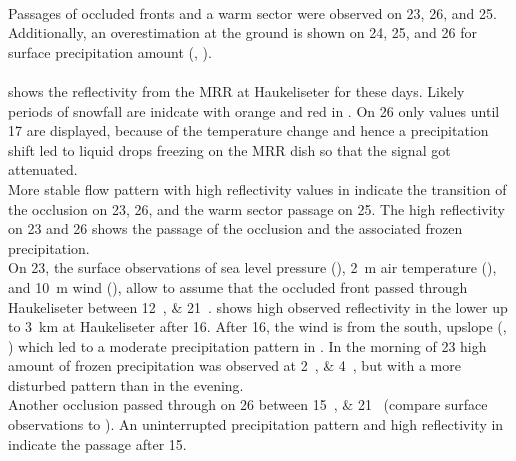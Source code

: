 \\
Passages of occluded fronts and a warm sector were observed on \num{23}, \num{26}, and \SI{25}{\dec}. Additionally, an overestimation at the ground is shown on  \num{24}, \num{25}, and \SI{26}{\dec} for surface precipitation amount (, ). 
\\
\\
 shows the reflectivity from the MRR at Haukeliseter for these days. Likely periods of snowfall are inidcate with orange and red in .%
On \SI{26}{\dec} only values until \SI{17}{\UTC} are displayed, because of the temperature change and hence a precipitation shift led to liquid drops freezing on the MRR dish so that the signal got attenuated. 
\\
More stable flow pattern with high reflectivity values in  indicate the transition of the occlusion on \num{23}, \num{26}, and the warm sector passage on \SI{25}{\dec}.
The high reflectivity on \num{23} and \SI{26}{\dec} shows the passage of the occlusion and the associated frozen precipitation.
\\
On \SI{23}{\dec}, the surface observations of sea level pressure (), \SI{2}{\metre} air temperature (), and \SI{10}{\metre} wind (), allow to assume that the occluded front passed through Haukeliseter between \SIlist{12;21}{\UTC}.
 shows high observed reflectivity in the lower up to \SI{3}{\km} at Haukeliseter after \SI{16}{\UTC}.
After \SI{16}{\UTC}, the wind is from the south, upslope (, ) which led to a moderate precipitation pattern in . 
In the morning of \SI{23}{\dec} high amount of frozen precipitation was observed at \SIlist{2;4}{\UTC}, but with a more disturbed pattern than in the evening.
\\
Another occlusion passed through on \SI{26}{\dec} between \SIlist{15;21}{\UTC} (compare surface observations  to ). An uninterrupted precipitation pattern and high reflectivity in  indicate the passage after \SI{15}{\UTC}. 
